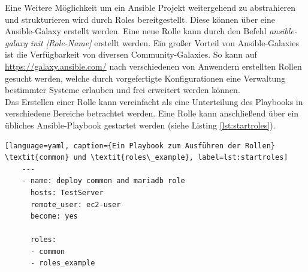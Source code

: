 \documentclass[biblatex]{lni}
\begin{document}
Eine Weitere Möglichkeit um ein Ansible Projekt weitergehend zu abstrahieren und strukturieren wird durch Roles bereitgestellt. Diese können über eine Ansible-Galaxy erstellt werden. Eine neue Rolle kann durch den Befehl \textit{ansible-galaxy init [Role-Name]} erstellt werden. Ein großer Vorteil von Ansible-Galaxies ist die Verfügbarkeit von diversen Community-Galaxies. So kann auf \url{https://galaxy.ansible.com/} nach verschiedenen von Anwendern erstellten Rollen gesucht werden, welche durch vorgefertigte Konfigurationen eine Verwaltung bestimmter Systeme erlauben und frei erweitert werden können.\\
Das Erstellen einer Rolle kann vereinfacht als eine Unterteilung des Playbooks in verschiedene Bereiche betrachtet werden. Eine Rolle kann anschließend über ein übliches Ansible-Playbook gestartet werden (siehe Listing \ref{lst:startroles}).
\begin{lstlisting}[language=yaml, caption={Ein Playbook zum Ausführen der Rollen} \textit{common} und \textit{roles\_example}, label=lst:startroles]
    ---
    - name: deploy common and mariadb role
      hosts: TestServer
      remote_user: ec2-user
      become: yes
    
      roles:
      - common
      - roles_example
\end{lstlisting}
\end{document}
